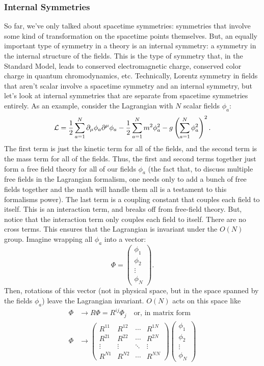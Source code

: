 \subsubsection{Internal Symmetries}
So far, we've only talked about spacetime symmetries: symmetries that involve some kind of transformation on the spacetime points themselves. But, an equally important type of symmetry in a theory is an internal symmetry: a symmetry in the internal structure of the fields. This is the type of symmetry that, in the Standard Model, leads to conserved electromagnetic charge, conserved color charge in quantum chromodynamics, etc. Technically, Lorentz symmetry in fields that aren't scalar involve a spacetime symmetry and an internal symmetry, but let's look at internal symmetries that are separate from spacetime symmetries entirely. As an example, consider the Lagrangian with $N$ scalar fields $\phi_a$:
\[
    \mathcal{L} = \frac{1}{2}\sum^{N}_{a=1}\partial_\mu\phi_a\partial^\mu\phi_a - \frac{1}{2}\sum_{a=1}^Nm^2\phi_a^2 - g\left(\sum_{a=1}^N\phi_a^2\right)^2.
\]
The first term is just the kinetic term for all of the fields, and the second term is the mass term for all of the fields. Thus, the first and second terms together just form a free field theory for all of our fields $\phi_a$ (the fact that, to discuss multiple free fields in the Lagrangian formalism, one needs only to add a bunch of free fields together and the math will handle them all is a testament to this formalisms power). The last term is a coupling constant that couples each field to itself. This is an interaction term, and breaks off from free-field theory. But, notice that the interaction term only couples each field to itself. There are no cross terms. This ensures that the Lagrangian is invariant under the $O(N)$ group. Imagine wrapping all $\phi_a$ into a vector:
\[
    \Phi = \begin{pmatrix}
        \phi_1 \\
        \phi_2 \\
        \vdots\\
        \phi_N
    \end{pmatrix}.
\]
Then, rotations of this vector (not in physical space, but in the space spanned by the fields $\phi_a$) leave the Lagrangian invariant. $O(N)$ acts on this space like
\begin{align*}
    \Phi&\rightarrow R\Phi = R^{ij}\Phi_j \quad\text{or, in matrix form}\\
    \Phi&\rightarrow \begin{pmatrix}
        R^{11} & R^{12} & \cdots & R^{1N}\\
        R^{21} & R^{22} & \cdots & R^{2N}\\
        \vdots & \vdots & \ddots & \vdots\\
        R^{N1} & R^{N2} & \cdots & R^{NN}
    \end{pmatrix}\begin{pmatrix}
        \phi_1\\
        \phi_2\\
        \vdots\\
        \phi_N
    \end{pmatrix}
\end{align*}
